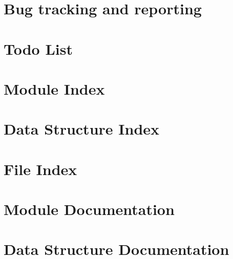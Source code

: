 \documentclass{book}
\begin{document}
\chapter{Bug tracking and reporting}
\label{sect_bugreporting}
\hypertarget{sect_bugreporting}{}

\chapter{Todo List}
\label{todo}
\hypertarget{todo}{}

\chapter{Module Index}

\chapter{Data Structure Index}

\chapter{File Index}

\chapter{Module Documentation}

















\chapter{Data Structure Documentation}






\end{document}
